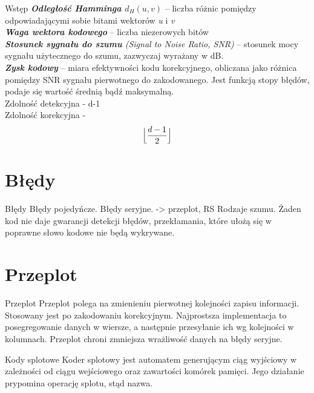 \documentclass[12pt]{beamer}
\begin{document}
\begin{frame}{Wstęp}
	\emph{\textbf{Odległość Hamminga $d_H(u, v)$}} -- liczba różnic pomiędzy odpowiadającymi sobie bitami wektorów \emph{u} i \emph{v}\\
	\emph{\textbf{Waga wektora kodowego}} -- liczba niezerowych bitów\\

	\emph{\textbf{Stosunek sygnału do szumu} (Signal to Noise Ratio, SNR)} -- stosunek mocy sygnału użytecznego do szumu, zazwyczaj wyrażany w dB.\\
	\emph{\textbf{Zysk kodowy}} -- miara efektywności kodu korekcyjnego, obliczana jako różnica pomiędzy SNR sygnału pierwotnego do zakodowanego. Jest funkcją stopy błędów, podaje się wartość średnią bądź maksymalną.\\
	Zdolność detekcyjna -  d-1\\
	Zdolność korekcyjna - 
	\begin{equation}
\Bigl\lfloor \frac{d-1}{2} \Bigr\rfloor	
\end{equation}	

	
\end{frame}

\section{Błędy}
\begin{frame}{Błędy}
Błędy pojedyńcze.
Błędy seryjne. -> przeplot, RS
Rodzaje szumu.
Żaden kod nie daje gwarancji detekcji błędów, przekłamania, które ułożą się w poprawne słowo kodowe nie będą wykrywane.
\end{frame}

\section{Przeplot}
\begin{frame}{Przeplot}
Przeplot polega na zmienieniu pierwotnej kolejności zapisu informacji. Stosowany jest po zakodowaniu korekcyjnym. Najprostsza implementacja to posegregowanie danych w wiersze, a następnie przesyłanie ich wg kolejności w kolumnach. Przeplot chroni zmniejsza wrażliwość danych na błędy seryjne.
\end{frame}

\begin{frame}{Kody splotowe}
Koder splotowy jest automatem generującym ciąg wyjściowy w zależności od ciągu wejściowego oraz zawartości komórek pamięci. Jego działanie prypomina operację splotu, stąd nazwa.
\end{frame}
\end{document}
